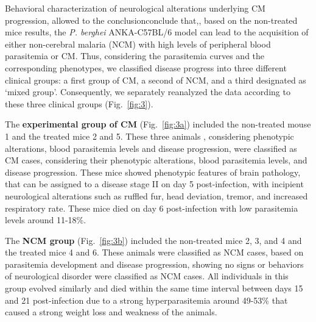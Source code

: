 \documentclass[empirical, authordate]{jote-new-article}
\begin{document}
Behavioral characterization of neurological alterations underlying CM progression, allowed to the conclusionconclude that,, based on the non-treated mice results, the \emph{P. berghei} ANKA-C57BL/6 model can lead to the acquisition of either non-cerebral malaria (NCM) with high levels of peripheral blood parasitemia or CM. Thus, considering the parasitemia curves and the corresponding phenotypes, we classified disease progress into three different clinical groups: a first group of CM, a second of NCM, and a third designated as `mixed group'. Consequently, we separately reanalyzed the data according to these three clinical groups (Fig.~\ref{fig:3}).

The \textbf{experimental group of CM }(Fig.~\ref{fig:3a}) included the non-treated mouse 1 and the treated mice 2 and 5. These three animals , considering phenotypic alterations, blood parasitemia levels and disease progression, were classified as CM cases, considering their phenotypic alterations, blood parasitemia levels, and disease progression. These mice showed phenotypic features of brain pathology, that can be assigned to a disease stage II on day 5 post-infection, with incipient neurological alterations such as ruffled fur, head deviation, tremor, and increased respiratory rate. These mice died on day 6 post-infection with low parasitemia levels around 11-18\%.


The \textbf{NCM group} (Fig.~\ref{fig:3b}) included the non-treated mice 2, 3, and 4 and the treated mice 4 and 6. These animals were classified as NCM cases, based on parasitemia development and disease progression, showing no signs or behaviors of neurological disorder were classified as NCM cases. All individuals in this group evolved similarly and died within the same time interval between days 15 and 21 post-infection due to a strong hyperparasitemia around 49-53\% that caused a strong weight loss and weakness of the animals.
\end{document}

